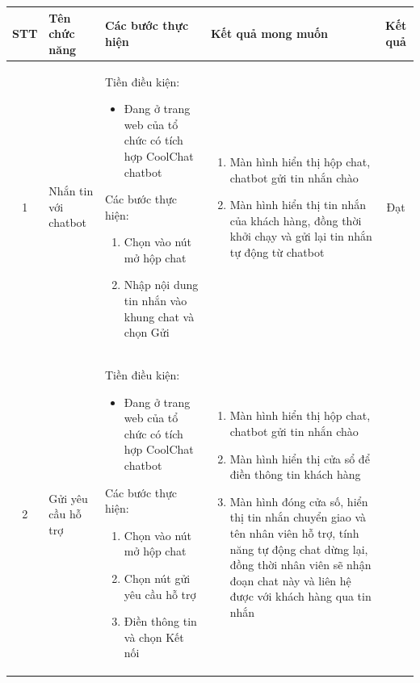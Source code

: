 \begin{longtable}{|c|m{2.5cm}|m{5.5cm}|m{4.5cm}|c|}
    \hline
    \textbf{STT} & \textbf{Tên chức năng} & \textbf{Các bước thực hiện} & \textbf{Kết quả mong muốn} & \textbf{Kết quả} \\
    \hline
    1 & 
    Nhắn tin với chatbot & 
    Tiền điều kiện:
    \begin{itemize}
        \item Đang ở trang web của tổ chức có tích hợp CoolChat chatbot
    \end{itemize}
    Các bước thực hiện: 
    \begin{enumerate}[label=\arabic*.]
        \item Chọn vào nút mở hộp chat
        \item Nhập nội dung tin nhắn vào khung chat và chọn Gửi
    \end{enumerate}
    & 
    \begin{enumerate}[label=\arabic*.]
        \item Màn hình hiển thị hộp chat, chatbot gửi tin nhắn chào
        \item Màn hình hiển thị tin nhắn của khách hàng, đồng thời khởi chạy và gửi lại tin nhắn tự động từ chatbot
    \end{enumerate}& Đạt \\
    \hline
    2 & 
    Gửi yêu cầu hỗ trợ & 
    Tiền điều kiện:
    \begin{itemize}
        \item Đang ở trang web của tổ chức có tích hợp CoolChat chatbot
    \end{itemize}
    Các bước thực hiện: 
    \begin{enumerate}[label=\arabic*.]
        \item Chọn vào nút mở hộp chat
        \item Chọn nút gửi yêu cầu hỗ trợ
        \item Điền thông tin và chọn Kết nối
    \end{enumerate}
    & 
    \begin{enumerate}[label=\arabic*.]
        \item Màn hình hiển thị hộp chat, chatbot gửi tin nhắn chào
        \item Màn hình hiển thị cửa sổ để điền thông tin khách hàng
        \item Màn hình đóng cửa số, hiển thị tin nhắn chuyển giao và tên nhân viên hỗ trợ, tính năng tự động chat dừng lại, đồng thời nhân viên sẽ nhận đoạn chat này và liên hệ được với khách hàng qua tin nhắn

\end{enumerate}
\end{longtable}
